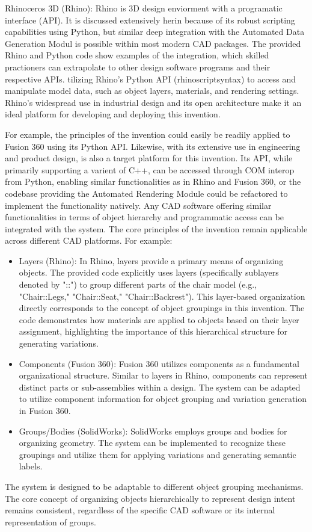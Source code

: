 \documentclass{article}
\begin{document}
Rhinoceros 3D (Rhino): Rhino is 3D design enviorment with a programatic interface (API). It is discussed extensively herin because of its robust scripting capabilities using Python, but similar deep integration with the Automated Data Generation Modul is possible within most modern CAD packages. The provided Rhino and Python code show examples of the integration, which skilled practioners can extrapolate to other design software programs and their respective APIs.  tilizing Rhino's Python API (rhinoscriptsyntax) to access and manipulate model data, such as object layers, materials, and rendering settings. Rhino’s widespread use in industrial design and its open architecture make it an ideal platform for developing and deploying this invention.

For example, the principles of the invention could easily be readily applied to Fusion 360 using its Python API. Likewise, with its extensive use in engineering and product design, is also a target platform for this invention. Its API, while primarily supporting a varient of C++, can be accessed through COM interop from Python, enabling similar functionalities as in Rhino and Fusion 360, or the codebase providing the Automated Rendering Module could be refactored to implement the functionality natively. Any CAD software offering similar functionalities in terms of object hierarchy and programmatic access can be integrated with the system. The core principles of the invention remain applicable across different CAD platforms. For example:


\begin{itemize}
    \item Layers (Rhino): In Rhino, layers provide a primary means of organizing objects. The provided code explicitly uses layers (specifically sublayers denoted by "::") to group different parts of the chair model (e.g., "Chair::Legs," "Chair::Seat," "Chair::Backrest"). This layer-based organization directly corresponds to the concept of object groupings in this invention. The code demonstrates how materials are applied to objects based on their layer assignment, highlighting the importance of this hierarchical structure for generating variations.
    \item Components (Fusion 360): Fusion 360 utilizes components as a fundamental organizational structure. Similar to layers in Rhino, components can represent distinct parts or sub-assemblies within a design. The system can be adapted to utilize component information for object grouping and variation generation in Fusion 360.

    \item Groups/Bodies (SolidWorks): SolidWorks employs groups and bodies for organizing geometry. The system can be implemented to recognize these groupings and utilize them for applying variations and generating semantic labels.
\end{itemize}
The system is designed to be adaptable to different object grouping mechanisms. The core concept of organizing objects hierarchically to represent design intent remains consistent, regardless of the specific CAD software or its internal representation of groups.
\end{document}

